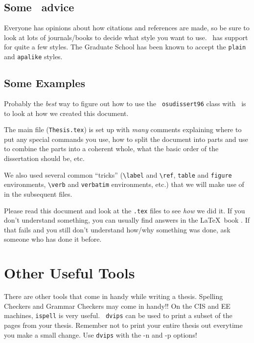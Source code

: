 \subsection{Some \BibTeX\ advice}

Everyone has opinions about how citations and references are made, so
be sure to look at lots of journals/books to decide what style you
want to use. \BibTeX\ has support for quite a few styles. The Graduate
School has been known to accept the {\tt plain} and {\tt apalike}
styles.

\subsection{Some Examples}
\label{good.examples}

Probably the {\em best} way to figure out how to use the {\tt
osudissert96} class with \LaTeXe\ is to look at how we created this
document. 

The main file ({\tt Thesis.tex}) is set up with {\em many} comments
explaining where to put any special commands you use, how to split the
document into parts and use \verb## to combine the parts into
a coherent whole, what the basic order of the dissertation should be,
etc.

We also used several common ``tricks'' (\verb#\label# and \verb#\ref#,
{\tt table} and {\tt figure} environments,
\verb#\verb# and {\tt verbatim} environments, etc.) that we will make
use of in the subsequent files.  

Please read this document and look at the {\tt .tex} files to see {\em
how} we did it.  If you don't understand something, you can usually
find answers in the \LaTeX\ book \cite{lamport:latex}.  If that fails
and you still don't understand how/why something was done, ask someone
who has done it before.

\section{Other Useful Tools}

There are other tools that come in handy while writing a thesis.
Spelling Checkers and Grammar Checkers may come in handy!! On the CIS and EE
machines, {\tt ispell} is very useful. {\tt
dvips} can be used to print a subset of the pages from your
thesis. Remember not to print your entire thesis out everytime you
make a small change. Use {\tt dvips} with the -n and -p options!

